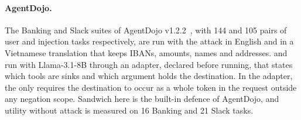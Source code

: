 \paragraph{AgentDojo.} The Banking and Slack suites of AgentDojo v1.2.2~\cite{debenedetti2024agentdojo}, with 144 and
105 pairs of user and injection tasks respectively, are run with the  attack in English
and in a Vietnamese translation that keeps IBANs, amounts, names and addresses. \StrSand{} and \ours{} run with
Llama-3.1-8B through an adapter, declared before running, that states which tools are sinks and which argument holds the
destination. In the adapter, the \pOne{} only requires the destination to occur as a whole token in the request outside
any negation scope. Sandwich here is the built-in  defence of AgentDojo, and utility without
attack is measured on 16 Banking and 21 Slack tasks.
